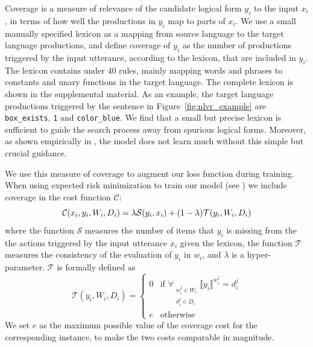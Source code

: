 Coverage is a measure of relevance of the candidate logical form $y_i$ to the input $x_i$, in terms of how well the productions in $y_i$ map to parts of $x_i$. We use a small manually specified lexicon as a mapping from source language to the target language productions, and define coverage of $y_i$ as the number of productions triggered by the input utterance, according to the lexicon, that are included in $y_i$. The lexicon contains under 40 rules, mainly mapping words and phrases to constants and unary functions in the target language. The complete lexicon is shown in the supplemental material. As an example, the target language productions triggered by the sentence in Figure~\ref{fig:nlvr_example} are \texttt{box\_exists}, \texttt{1} and \texttt{color\_blue}. We find that a small but precise lexicon is sufficient to guide the search process away from spurious logical forms. Moreover, as shown empirically in , the model does not learn much without this simple but crucial guidance.

We use this measure of coverage to augment our loss function during training.  When using expected risk minimization to train our model (see ) we include coverage in the cost function $\mathcal{C}$:
\begin{equation}
	\mathcal{C}(x_i, y_i, W_i, D_i) = \lambda \mathcal{S}(y_i, x_i) + \\
		(1 - \lambda)\mathcal{T}(y_i, W_i, D_i)
		\label{eq:cost}
\end{equation}
where the function $\mathcal{S}$ measures the number of items that $y_i$ is missing from the the actions triggered by the input utterance $x_i$ given the lexicon, the function $\mathcal{T}$ measures the consistency of the evaluation of $y_i$ in $w_i$, and $\lambda$ is a hyper-parameter.  $\mathcal{T}$ is formally defined as
\begin{equation}
	\mathcal{T}(y_i, W_i, D_i) = \begin{cases}
		0 &\text{if } \forall_{\substack{w^j_i \in W_i\\d^j_i \in D_i}} \llbracket y_i \rrbracket^{w^j_i} = d^j_i\\
		e &\text{otherwise}
	\end{cases}
	\label{eq:consistency}
\end{equation}
We set $e$ as the maximum possible value of the coverage cost for the corresponding instance, to make the two costs comparable in magnitude.

